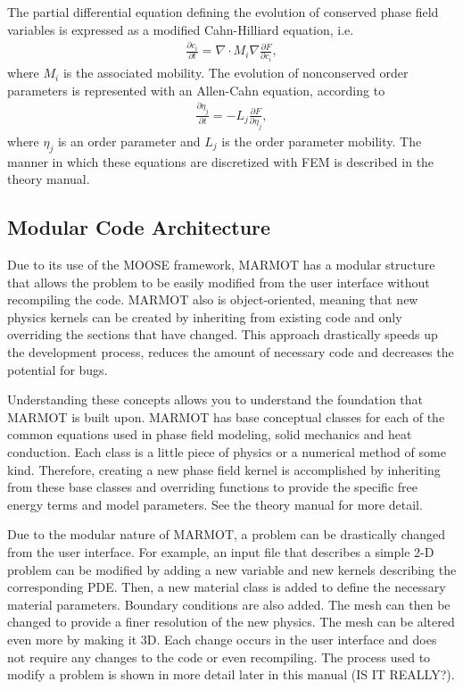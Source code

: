 \documentclass[letter,12pt,fleqn]{article}
\begin{document}
The partial differential equation defining the evolution of conserved phase field variables is expressed as a modified Cahn-Hilliard equation, i.e.
\begin{eqnarray}
	\frac{\partial c_i}{\partial t} = \nabla \cdot M_i \nabla \frac{\partial F}{\partial c_i}, \label{eq:CH}
\end{eqnarray} 
where $M_i$ is the associated mobility.  The evolution of nonconserved order parameters is represented with an Allen-Cahn equation, according to
\begin{eqnarray}
	\frac{\partial \eta_j}{\partial t} = - L_j \frac{\partial F}{\partial \eta_j}, \label{eq:AC}
\end{eqnarray}
where $\eta_j$ is an order parameter and $L_j$ is the order parameter mobility.  The manner in which these equations are discretized with FEM is described in the theory manual.

\subsection{Modular Code Architecture}

Due to its use of the MOOSE framework, MARMOT has a modular structure that allows the problem to be easily modified from the user interface without recompiling the code. MARMOT also is object-oriented, meaning that new physics kernels can be created by inheriting from existing code and only overriding the sections that have changed. This approach drastically speeds up the development process, reduces the amount of necessary code and decreases the potential for bugs.

Understanding these concepts allows you to understand the foundation that MARMOT is built upon. MARMOT has base conceptual classes for each of the common equations used in phase field modeling, solid mechanics and heat conduction. Each class is a little piece of physics or a numerical method of some kind. Therefore, creating a new phase field kernel is accomplished by inheriting from these base classes and overriding functions to provide the specific free energy terms and model parameters. See the theory manual for more detail.

Due to the modular nature of MARMOT, a problem can be drastically changed from the user interface. For example, an input file that describes a simple 2-D problem can be modified by adding a new variable and new kernels describing the corresponding PDE. Then, a new material class is added to define the necessary material parameters. Boundary conditions are also added. The mesh can then be changed to provide a finer resolution of the new physics. The mesh can be altered even more by making it 3D. Each change occurs in the user interface and does not require any changes to the code or even recompiling. The process used to modify a problem is shown in more detail later in this manual (IS IT REALLY?). 
\end{document}
